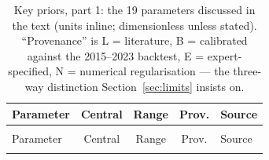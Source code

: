 \documentclass[12pt,a4paper]{article}
\begin{document}
\begingroup\small
\setlength{\LTcapwidth}{\linewidth}
\begin{xltabular}{\linewidth}{@{}>{\raggedright\arraybackslash}p{5.2cm}ccc L@{}}
\caption{Key priors, part 1: the 19 parameters discussed in the text (units inline;
dimensionless unless stated). ``Provenance'' is L = literature, B = calibrated against the
2015--2023 backtest, E = expert-specified, N = numerical regularisation --- the three-way
distinction Section~\ref{sec:limits} insists on.}\label{tab:priors1}\\
\toprule
Parameter & Central & Range & Prov. & Source \\
\midrule
\endfirsthead
{}\\
\toprule
Parameter & Central & Range & Prov. & Source \\
\midrule
\endhead
\bottomrule
\endlastfoot


\end{xltabular}
\end{document}
